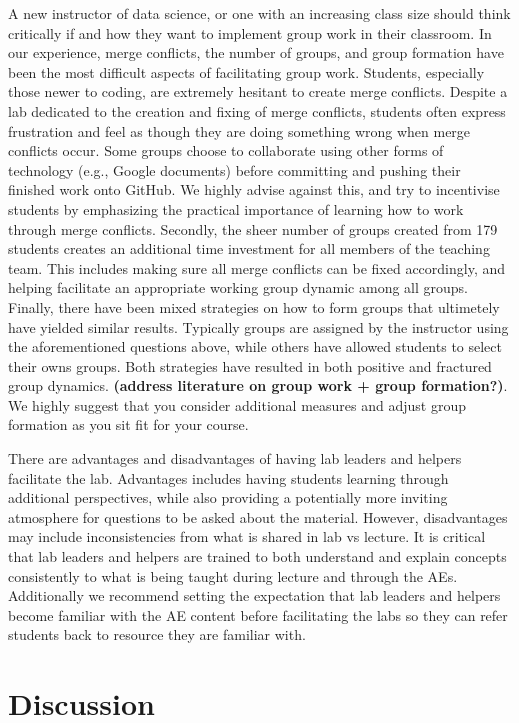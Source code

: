 \documentclass[
  12pt]{article}
\begin{document}
A new instructor of data science, or one with an increasing class size
should think critically if and how they want to implement group work in
their classroom. In our experience, merge conflicts, the number of
groups, and group formation have been the most difficult aspects of
facilitating group work. Students, especially those newer to coding, are
extremely hesitant to create merge conflicts. Despite a lab dedicated to
the creation and fixing of merge conflicts, students often express
frustration and feel as though they are doing something wrong when merge
conflicts occur. Some groups choose to collaborate using other forms of
technology (e.g., Google documents) before committing and pushing their
finished work onto GitHub. We highly advise against this, and try to
incentivise students by emphasizing the practical importance of learning
how to work through merge conflicts. Secondly, the sheer number of
groups created from 179 students creates an additional time investment
for all members of the teaching team. This includes making sure all
merge conflicts can be fixed accordingly, and helping facilitate an
appropriate working group dynamic among all groups. Finally, there have
been mixed strategies on how to form groups that ultimetely have yielded
similar results. Typically groups are assigned by the instructor using
the aforementioned questions above, while others have allowed students
to select their owns groups. Both strategies have resulted in both
positive and fractured group dynamics. \textbf{(address literature on
group work + group formation?)}. We highly suggest that you consider
additional measures and adjust group formation as you sit fit for your
course.

There are advantages and disadvantages of having lab leaders and helpers
facilitate the lab. Advantages includes having students learning through
additional perspectives, while also providing a potentially more
inviting atmosphere for questions to be asked about the material.
However, disadvantages may include inconsistencies from what is shared
in lab vs lecture. It is critical that lab leaders and helpers are
trained to both understand and explain concepts consistently to what is
being taught during lecture and through the AEs. Additionally we
recommend setting the expectation that lab leaders and helpers become
familiar with the AE content before facilitating the labs so they can
refer students back to resource they are familiar with.

\hypertarget{discussion}{%
\section{Discussion}\label{discussion}}
\end{document}
